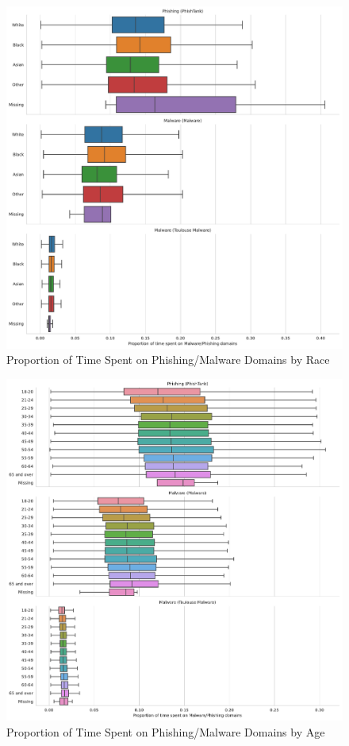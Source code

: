 \documentclass[12pt, letterpaper]{article}
\begin{document}
\begin{figure}[!htb]
	 \centering
	 \caption{Proportion of Time Spent on Phishing/Malware Domains by Race}
	 \label{fig:prop_total_time_phishing_malware_race}
	 \includegraphics[width=\textwidth]{figs/prop_total_time_phishing_malware_tl_race.pdf}
\end{figure}

\begin{figure}[!htb]
	 \centering
	 \caption{Proportion of Time Spent on Phishing/Malware Domains by Age}
	 \label{prop_total_time_phishing_malware_age}
	 \includegraphics[width=\textwidth]{figs/prop_total_time_phishing_malware_tl_age.pdf}
\end{figure}
\end{document}
